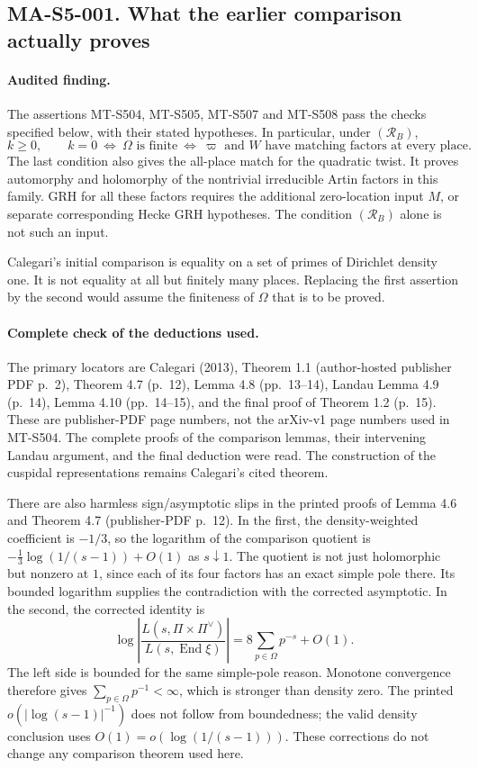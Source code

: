 \subsection*{MA-S5-001. What the earlier comparison actually proves}

\paragraph{Audited finding.}
The assertions MT-S504, MT-S505, MT-S507 and MT-S508 pass the checks
specified below, with their stated hypotheses. In particular, under
$(\mathcal R_B)$,
\[
 k\ge0,\qquad
 k=0\ \Longleftrightarrow\ \Omega\text{ is finite}
 \ \Longleftrightarrow\
 \varpi\text{ and }W\text{ have matching factors at every place}.
 \tag{MA-S5.2}
\]
The last condition also gives the all-place match for the quadratic
twist. It proves automorphy and holomorphy of the nontrivial irreducible
Artin factors in this family. GRH for all these factors requires the
additional zero-location input $M$, or separate corresponding Hecke
GRH hypotheses. The condition $(\mathcal R_B)$ alone is not such an input.

Calegari's initial comparison is equality on a set of primes of
Dirichlet density one. It is not equality at all but finitely many
places. Replacing the first assertion by the second would assume
the finiteness of $\Omega$ that is to be proved.

\paragraph{Complete check of the deductions used.}
The primary locators are Calegari (2013), Theorem 1.1 (author-hosted
publisher PDF p.~2), Theorem 4.7 (p.~12), Lemma 4.8 (pp.~13--14),
Landau Lemma 4.9 (p.~14), Lemma 4.10 (pp.~14--15), and the final
proof of Theorem 1.2 (p.~15). These are publisher-PDF page numbers,
not the arXiv-v1 page numbers used in MT-S504. The complete proofs
of the comparison lemmas, their intervening Landau argument, and
the final deduction were read. The construction of the cuspidal
representations remains Calegari's cited theorem.

There are also harmless sign/asymptotic slips in the printed proofs
of Lemma 4.6 and Theorem 4.7 (publisher-PDF p.~12). In the first,
the density-weighted coefficient is $-1/3$, so the logarithm of
the comparison quotient is
$-\frac13\log(1/(s-1))+O(1)$ as $s\downarrow1$.
The quotient is not just holomorphic but nonzero at $1$, since
each of its four factors has an exact simple pole there. Its
bounded logarithm supplies the contradiction with the corrected
asymptotic. In the second, the corrected identity is
\[
 \log\left|\frac{L(s,\Pi\times\Pi^\vee)}
                       {L(s,\operatorname{End}\xi)}\right|
       =8\sum_{p\in\Omega}p^{-s}+O(1).
\]
The left side is bounded for the same simple-pole reason.
Monotone convergence therefore gives
$\sum_{p\in\Omega}p^{-1}<\infty$, which is stronger than density
zero. The printed $o(|\log(s-1)|^{-1})$ does not follow from
boundedness; the valid density conclusion uses
$O(1)=o(\log(1/(s-1)))$. These corrections do not change any
comparison theorem used here.

